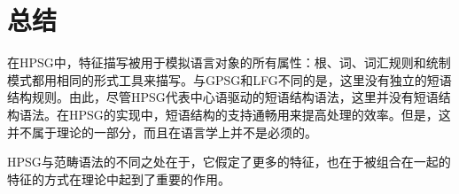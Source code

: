 

\section{总结}

在HPSG中，特征描写被用于模拟语言对象的所有属性：根、词、词汇规则和统制模式都用相同的形式工具来描写。与GPSG\indexgpsg 和LFG\indexlfg 不同的是，这里没有独立的短语结构规则。由此，尽管HPSG代表中心语驱动的短语结构语法，这里并没有短语结构语法。在HPSG的实现中，短语结构的支持通畅用来提高处理的效率。但是，这并不属于理论的一部分，而且在语言学上并不是必须的。

HPSG与范畴语法\indexcg 的不同之处在于，它假定了更多的特征，也在于被组合在一起的特征的方式在理论中起到了重要的作用。


